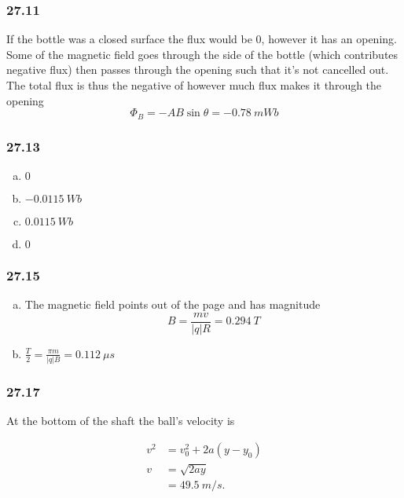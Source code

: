 \documentclass{article}
\begin{document}
\subsubsection{27.11}

If the bottle was a closed surface the flux would be 0, however it has an opening. Some of the magnetic field goes through the side of the bottle (which contributes negative flux) then passes through the opening such that it's not cancelled out. The total flux is thus the negative of however much flux makes it through the opening \[\Phi_B = -A B \sin \theta = \qty{-0.78}{mWb}\]

\subsubsection{27.13}

\begin{enumerate}[(a)]
  \item $0$

  \item $\qty{-0.0115}{Wb}$

  \item $\qty{0.0115}{Wb}$

  \item $0$
\end{enumerate}

\subsubsection{27.15}

\begin{enumerate}[(a)]
  \item The magnetic field points out of the page and has magnitude \[B = \frac{m v}{|q| R} = \qty{0.294}{T}\]

  \item $\frac{T}{2} = \frac{\pi m}{|q| B} = \qty{0.112}{\mu s}$
\end{enumerate}

\subsubsection{27.17}

At the bottom of the shaft the ball's velocity is

\begin{align*}
  v^2 & = v_0^2 + 2 a (y - y_0) \\
  v   & = \sqrt{2 a y}          \\
      & = \qty{49.5}{m/s}.
\end{align*}
\end{document}
